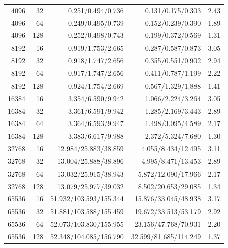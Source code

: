 \documentclass[11pt]{article}
\begin{document}
{\begin{longtable}{rrrrr}
  4096 & 32 & 0.251/0.494/0.736 & 0.131/0.175/0.303 & 2.43 \\
  4096 & 64 & 0.249/0.495/0.739 & 0.152/0.239/0.390 & 1.89 \\
  4096 & 128 & 0.252/0.498/0.743 & 0.199/0.372/0.569 & 1.31 \\
  8192 & 16 & 0.919/1.753/2.665 & 0.287/0.587/0.873 & 3.05 \\
  8192 & 32 & 0.918/1.747/2.656 & 0.355/0.551/0.902 & 2.94 \\
  8192 & 64 & 0.917/1.747/2.656 & 0.411/0.787/1.199 & 2.22 \\
  8192 & 128 & 0.924/1.754/2.669 & 0.567/1.329/1.888 & 1.41 \\
  16384 & 16 & 3.354/6.590/9.942 & 1.066/2.224/3.264 & 3.05 \\
  16384 & 32 & 3.361/6.591/9.942 & 1.285/2.169/3.443 & 2.89 \\
  16384 & 64 & 3.364/6.593/9.947 & 1.498/3.095/4.589 & 2.17 \\
  16384 & 128 & 3.383/6.617/9.988 & 2.372/5.324/7.680 & 1.30 \\
  32768 & 16 & 12.984/25.883/38.859 & 4.055/8.434/12.495 & 3.11 \\
  32768 & 32 & 13.004/25.888/38.896 & 4.995/8.471/13.453 & 2.89 \\
  32768 & 64 & 13.032/25.915/38.943 & 5.872/12.090/17.966 & 2.17 \\
  32768 & 128 & 13.079/25.977/39.032 & 8.502/20.653/29.085 & 1.34 \\
  65536 & 16 & 51.932/103.593/155.344 & 15.876/33.045/48.938 & 3.17 \\
  65536 & 32 & 51.881/103.588/155.459 & 19.672/33.513/53.179 & 2.92 \\
  65536 & 64 & 52.073/103.830/155.955 & 23.156/47.768/70.931 & 2.20 \\
  65536 & 128 & 52.348/104.085/156.790 & 32.599/81.685/114.249 & 1.37 \\
  \bottomrule
\end{longtable}
}
\end{document}
